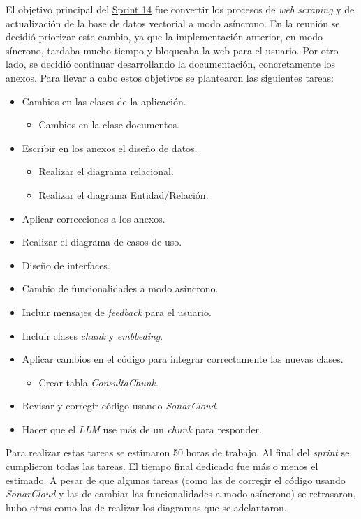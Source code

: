 El objetivo principal del \href{https://github.com/lbr1014/TFG_RAG/milestone/14?closed=1}{Sprint 14} fue convertir los procesos de \textit{web scraping} y de actualización de la base de datos vectorial a modo asíncrono. En la reunión se decidió priorizar este cambio, ya que la implementación anterior, en modo síncrono, tardaba mucho tiempo y bloqueaba la web para el usuario. Por otro lado, se decidió continuar desarrollando la documentación, concretamente los anexos. Para llevar a cabo estos objetivos se plantearon las siguientes tareas:
\begin{itemize}
\tightlist
	\item Cambios en las clases de la aplicación.
	\begin{itemize}
	\tightlist
		\item Cambios en la clase documentos.
	\end{itemize} 
	\item Escribir en los anexos el diseño de datos.
	\begin{itemize}
	\tightlist
		\item Realizar el diagrama relacional.
		\item Realizar el diagrama Entidad/Relación.
	\end{itemize}
	\item Aplicar correcciones a los anexos.
	\item Realizar el diagrama de casos de uso.
	\item Diseño de interfaces.
	\item Cambio de funcionalidades a modo asíncrono.
	\item Incluir mensajes de \textit{feedback} para el usuario.
	\item Incluir clases \textit{chunk} y \textit{embbeding}.
	\item Aplicar cambios en el código para integrar correctamente las nuevas clases.
	\begin{itemize}
	\tightlist
		\item Crear tabla \textit{ConsultaChunk}.
	\end{itemize}
	\item Revisar y corregir código usando \textit{SonarCloud}.
	\item Hacer que el \textit{LLM} use más de un \textit{chunk} para responder.
\end{itemize}

Para realizar estas tareas se estimaron 50 horas de trabajo. Al final del \textit{sprint} se cumplieron todas las tareas. El tiempo final dedicado fue más o menos el estimado. A pesar de que algunas tareas (como las de corregir el código usando \textit{SonarCloud} y las de cambiar las funcionalidades a modo asíncrono) se retrasaron, hubo otras como las de realizar los diagramas que se adelantaron.

